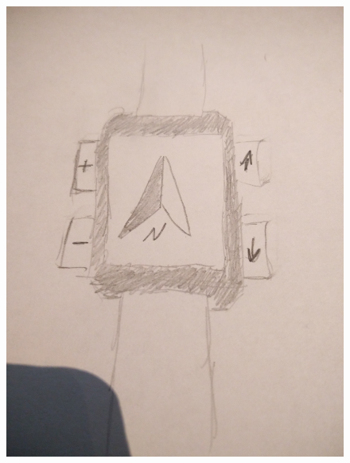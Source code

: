 \documentclass[a4paper,10pt]{article}
\begin{document}
\begin{figure}[ht]
\centering \includegraphics[width=1.0\textwidth]{images/uhr.jpg}
\label{fig:wwu_logo}
\end{figure}\begin{figure}[ht]

\end{figure}
\end{document}
